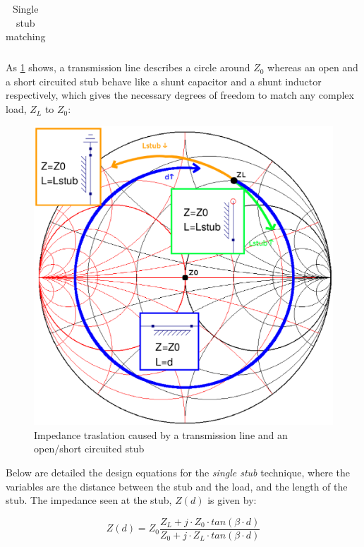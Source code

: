 \begin{table}[H]
\begin{tabular}{ | c | c | }
\begin{minipage}{.4\textwidth}
    \end{minipage}
    \\ \hline
  \end{tabular}
  \caption{Single stub matching}
  \label{tbl:sngstub}
\end{table}


As \ref{fig:SmithTL} shows, a transmission line describes a circle around $Z_0$ whereas an open and a short circuited stub behave like a shunt capacitor and a shunt inductor respectively, which gives the necessary degrees of freedom to match any complex load, $Z_L$ to $Z_0$:

\begin{figure}[H]
\centering
\includegraphics[width=120mm]{./images/Synthesis/Impedance_Matching/SmithChartTL}
\caption{Impedance traslation caused by a transmission line and an open/short circuited stub}
\label{fig:SmithTL}
\end{figure}


\noindent Below are detailed the design equations for the \textit{single stub} technique, where the variables are the distance between the stub and the load, and the length of the stub. The impedance seen at the stub, $Z(d)$ is given by:

\begin{equation}
Z(d) = Z_0 \frac{Z_L + j\cdot Z_0\cdot tan(\beta \cdot d)}{Z_0 + j\cdot Z_L \cdot tan(\beta \cdot d)}
\end{equation}

